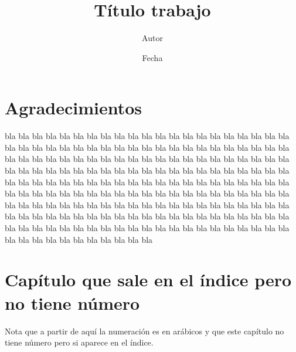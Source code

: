 \documentclass[12pt]{book}%
\theoremstyle{definition}%
\begin{document}
\title{Título trabajo}
\author{Autor}
\date{Fecha}
\maketitle

\tableofcontents





\chapter*{Agradecimientos}
\markboth{}{} %

bla bla bla bla bla bla bla bla bla bla bla bla bla bla bla bla bla bla bla bla bla bla bla bla bla bla bla bla bla bla bla bla bla bla bla bla bla bla bla bla bla bla bla bla bla bla bla bla bla bla bla bla bla bla bla bla bla bla bla bla bla bla bla bla bla bla bla bla bla bla bla bla bla bla bla bla bla bla bla bla bla bla bla bla bla bla bla bla bla bla bla bla bla bla bla bla bla bla bla bla bla bla bla bla bla bla bla bla bla bla bla bla bla bla bla bla bla bla bla bla bla bla bla bla bla bla bla bla bla bla bla bla bla bla bla bla bla bla bla bla bla bla bla bla bla bla bla bla bla bla bla bla bla bla bla bla bla bla bla bla bla bla bla bla bla bla bla bla bla bla bla bla bla bla bla bla bla bla bla bla bla bla bla bla bla bla bla bla bla bla bla bla bla bla bla bla bla bla bla bla




\chapter*{Capítulo que sale en el índice pero no tiene número}%

Nota que a partir de aquí la numeración es en arábicos y que este capítulo no tiene número pero si aparece en el índice.
\end{document}
